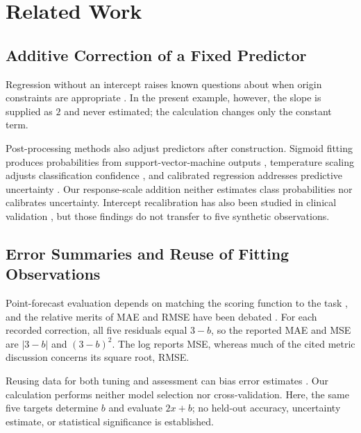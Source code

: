 \documentclass[11pt]{article}
\begin{document}
\section{Related Work}

\subsection{Additive Correction of a Fixed Predictor}

Regression without an intercept raises known questions about when origin constraints are appropriate \cite{Hahn1977FittingRegression,Eisenhauer2003RegressionThrough}. In the present example, however, the slope is supplied as $2$ and never estimated; the calculation changes only the constant term.

Post-processing methods also adjust predictors after construction. Sigmoid fitting produces probabilities from support-vector-machine outputs \cite{Platt1999ProbabilisticOutputs}, temperature scaling adjusts classification confidence \cite{Guo2017CalibrationModern}, and calibrated regression addresses predictive uncertainty \cite{Kuleshov2018AccurateUncertainties}. Our response-scale addition neither estimates class probabilities nor calibrates uncertainty. Intercept recalibration has also been studied in clinical validation \cite{Steyerberg2004ValidationUpdating}, but those findings do not transfer to five synthetic observations.

\subsection{Error Summaries and Reuse of Fitting Observations}

Point-forecast evaluation depends on matching the scoring function to the task \cite{Gneiting2011MakingEvaluating}, and the relative merits of MAE and RMSE have been debated \cite{Willmott2005AdvantagesMean,Hodson2022RootmeansquareError}. For each recorded correction, all five residuals equal $3-b$, so the reported MAE and MSE are $|3-b|$ and $(3-b)^2$. The log reports MSE, whereas much of the cited metric discussion concerns its square root, RMSE.

Reusing data for both tuning and assessment can bias error estimates \cite{Varma2006BiasError}. Our calculation performs neither model selection nor cross-validation. Here, the same five targets determine $b$ and evaluate $2x+b$; no held-out accuracy, uncertainty estimate, or statistical significance is established.
\end{document}
